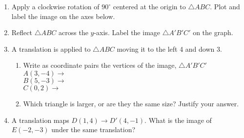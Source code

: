 \documentclass[12pt, twoside]{article}
\begin{document}
\begin{enumerate}[itemsep=0.5cm]
\item Apply a clockwise rotation of $90^\circ$ centered at the origin to $\triangle ABC$. Plot and label the image on the axes below.
  \begin{flushright}
  \end{flushright}

\newpage
\item  Reflect $\triangle ABC$ across the $y$-axis. Label the image $\triangle A'B'C'$ on the graph.
  \begin{center}
    \end{center}

\item A translation is applied to $\triangle ABC$ moving it to the left 4 and down 3.
\begin{enumerate}
  \item Write as coordinate pairs the vertices of the image, $\triangle A'B'C'$ \\[0.3cm]
  $A(3,-4) \rightarrow$ \\[0.7cm]
  $B(5,-3) \rightarrow$ \\[0.7cm]
  $C(0,2) \rightarrow$ %
  \item Which triangle is larger, or are they the same size? Justify your answer.
\end{enumerate} \vspace{2cm}


\item A translation maps $D(1,4) \rightarrow D'(4,-1)$. What is the image of $E(-2,-3)$ under the same translation? \vspace{2cm}



\end{enumerate}
\end{document}
